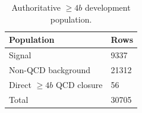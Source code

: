\begin{table}[tb]
  \centering
  \footnotesize
  \caption{Authoritative $\geq4b$ development population.}
  \label{tab:fourb-population}
  \begin{tabular}{ll}
    \toprule
    Population & Rows \\
    \midrule
    Signal & 9337 \\
    Non-QCD background & 21312 \\
    Direct $\geq4b$ QCD closure & 56 \\
    Total & 30705 \\
    \bottomrule
  \end{tabular}
\end{table}
